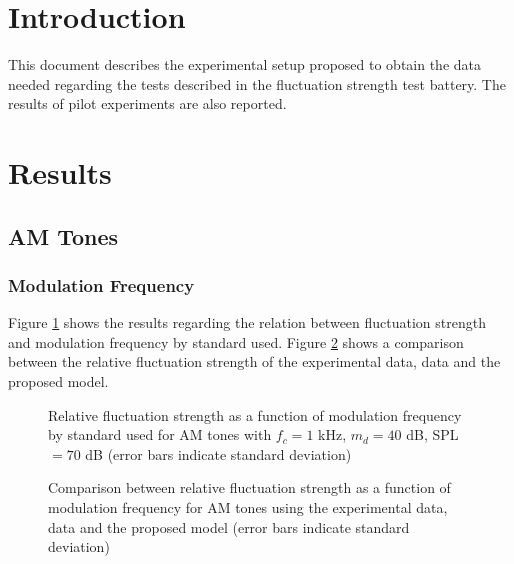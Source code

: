 \documentclass[a4paper]{article}
\begin{document}

\section{Introduction}

This document describes the experimental setup proposed to obtain the data
needed regarding the tests described in the fluctuation strength test battery.
The results of pilot experiments are also reported.

\section{Results}

\subsection{AM Tones}

\subsubsection{Modulation Frequency}

Figure \ref{fig:amstds} shows the results regarding the relation between
fluctuation strength and modulation frequency by standard used. Figure
\ref{fig:amcomp} shows a comparison between the relative fluctuation strength
of the experimental data, \citeauthor{Fastl2007Psychoacoustics} data and the
proposed model.

\begin{figure}[ht]
    \centering
    \resizebox{!}{10cm}{
        
    }
    \caption{Relative fluctuation strength as a function of modulation
        frequency by standard used for AM tones with $f_c = 1$ kHz, $m_d = 40$
        dB, SPL $= 70$ dB (error bars indicate standard deviation)}
    \label{fig:amstds}
\end{figure}

\begin{figure}[ht]
    \centering
    \resizebox{!}{10cm}{
        
    }
    \caption{Comparison between relative fluctuation strength as a function of
        modulation frequency for AM tones using the experimental data,
        \citeauthor{Fastl2007Psychoacoustics} data and the proposed model
        (error bars indicate standard deviation)}
    \label{fig:amcomp}
\end{figure}
\end{document}
